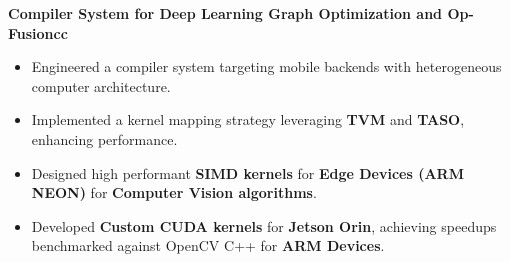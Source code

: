 \documentclass[10pt,a4]{article}
\begin{document}
{\begin{flushleft}

    \vspace{0.5mm}
    \item \textbf{\large Compiler System for Deep Learning Graph Optimization and Op-Fusioncc}
        \vspace{0.5mm}
        \begin{itemize}
            \item Engineered a compiler system targeting mobile backends with heterogeneous computer architecture.
            \item Implemented a kernel mapping strategy leveraging \textbf{TVM} and \textbf{TASO}, enhancing performance.
            \item Designed high performant \textbf{SIMD kernels} for \textbf{Edge Devices (ARM NEON)} for \textbf{Computer Vision algorithms}.
            \item Developed \textbf{Custom CUDA kernels} for \textbf{Jetson Orin}, achieving speedups benchmarked against OpenCV C++ for \textbf{ARM Devices}.
        \end{itemize}


\end{flushleft}}
\end{document}
